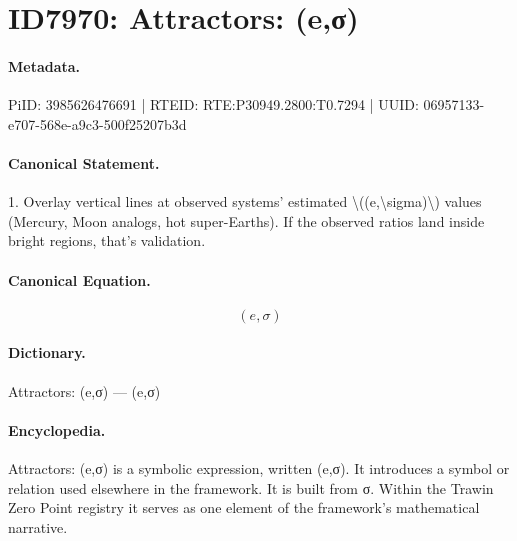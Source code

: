 \section*{ID7970: Attractors: (e,σ)}
\paragraph{Metadata.}
PiID: 3985626476691 | RTEID: RTE:P30949.2800:T0.7294 | UUID: 06957133-e707-568e-a9c3-500f25207b3d

\paragraph{Canonical Statement.}
1. Overlay vertical lines at observed systems’ estimated \textbackslash{}((e,\textbackslash{}sigma)\textbackslash{}) values (Mercury, Moon analogs, hot super-Earths). If the observed ratios land inside bright regions, that’s validation.

\paragraph{Canonical Equation.}
\[
(e,\sigma)
\]

\paragraph{Dictionary.}
Attractors: (e,σ) — (e,σ)

\paragraph{Encyclopedia.}
Attractors: (e,σ) is a symbolic expression, written (e,σ). It introduces a symbol or relation used elsewhere in the framework. It is built from σ. Within the Trawin Zero Point registry it serves as one element of the framework's mathematical narrative.
